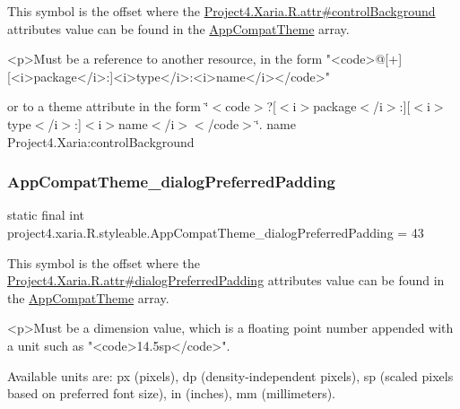 This symbol is the offset where the \hyperlink{}{Project4.\+Xaria.\+R.\+attr\#control\+Background} attribute\textquotesingle{}s value can be found in the \hyperlink{classproject4_1_1xaria_1_1R_1_1styleable_aad8bec413e2350f9404e6ff0e831a85d}{App\+Compat\+Theme} array.

\begin{DoxyVerb}      <p>Must be a reference to another resource, in the form "<code>@[+][<i>package</i>:]<i>type</i>:<i>name</i></code>"
\end{DoxyVerb}
 or to a theme attribute in the form \char`\"{}$<$code$>$?\mbox{[}$<$i$>$package$<$/i$>$\+:\mbox{]}\mbox{[}$<$i$>$type$<$/i$>$\+:\mbox{]}$<$i$>$name$<$/i$>$$<$/code$>$\char`\"{}.  name Project4.\+Xaria\+:control\+Background \mbox{\label{classproject4_1_1xaria_1_1R_1_1styleable_a23b0ff0c142da87ba4d26058c02051dd}} 
\subsubsection{\texorpdfstring{App\+Compat\+Theme\+\_\+dialog\+Preferred\+Padding}{AppCompatTheme\_dialogPreferredPadding}}
{\footnotesize\ttfamily static final int project4.\+xaria.\+R.\+styleable.\+App\+Compat\+Theme\+\_\+dialog\+Preferred\+Padding = 43\hspace{0.3cm}{\ttfamily [static]}}

This symbol is the offset where the \hyperlink{}{Project4.\+Xaria.\+R.\+attr\#dialog\+Preferred\+Padding} attribute\textquotesingle{}s value can be found in the \hyperlink{classproject4_1_1xaria_1_1R_1_1styleable_aad8bec413e2350f9404e6ff0e831a85d}{App\+Compat\+Theme} array.

\begin{DoxyVerb}      <p>Must be a dimension value, which is a floating point number appended with a unit such as "<code>14.5sp</code>".
\end{DoxyVerb}
 Available units are\+: px (pixels), dp (density-\/independent pixels), sp (scaled pixels based on preferred font size), in (inches), mm (millimeters). 

